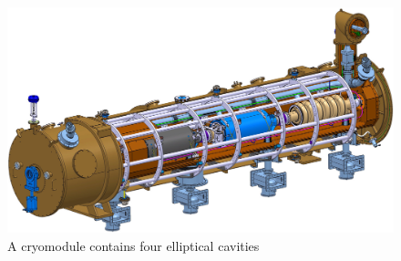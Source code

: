 \begin{figure}[!ht]
	\begin{center}
		\includegraphics[width=\textwidth]{02_BeamDiag/figures/fig000_cryo_a2}
	\end{center}
	\caption[A cryomodule contains four elliptical cavities.]{A cryomodule contains four elliptical cavities}
	\label{chap:}
\end{figure}
